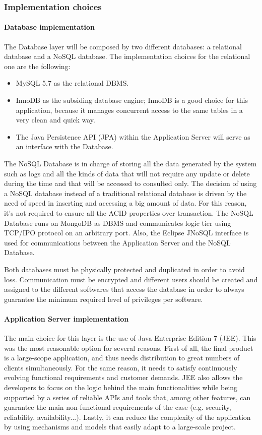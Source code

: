 \subsubsection{Implementation choices}
\paragraph*{Database implementation}
The Database layer will be composed by two different databases: a relational database and a NoSQL database. The implementation choices for the relational one are the following:

\begin{itemize}
\item MySQL 5.7 as the relational DBMS.
\item InnoDB as the subsiding database engine; InnoDB is a good choice for this application, because it manages concurrent access to the same tables in a very clean and quick way.
\item The Java Persistence API (JPA) within the Application Server will serve as an interface with the Database.
\end{itemize}

The NoSQL Database is in charge of storing all the data generated by the system such as logs and all the kinds of data that  will not require any update or delete during the time and that will be accessed to consulted only. The decision of using a NoSQL database instead of a traditional relational database is driven by the need of speed in inserting and accessing a big amount of data. For this reason, it's not required to ensure all the ACID properties over transaction. The NoSQL Database runs on MongoDB as DBMS and communicates logic tier using TCP/IPO protocol on an arbitrary port. Also, the Eclipse JNoSQL interface is used for communications between the Application Server and the NoSQL Database.

Both databases must be physically protected and duplicated in order to avoid loss. Communication must be encrypted and different users should be created and assigned to the different softwares that access the database in order to always guarantee the minimum required level of privileges per software.

\paragraph*{Application Server implementation}
The main choice for this layer is the use of Java Enterprise Edition 7 (JEE). This was the most reasonable option for several reasons. First of all, the final product is a large-scope application, and thus needs distribution to great numbers of clients simultaneously. For the same reason, it needs to satisfy continuously evolving functional requirements and customer demands. JEE also allows the developers to focus on the logic behind the main functionalities while being supported by a series of reliable APIs and tools that, among other features, can guarantee the main non-functional requirements of the case (e.g. security, reliability, availability...). Lastly, it can reduce the complexity of the application by using mechanisms and models that easily adapt to a large-scale project. 


